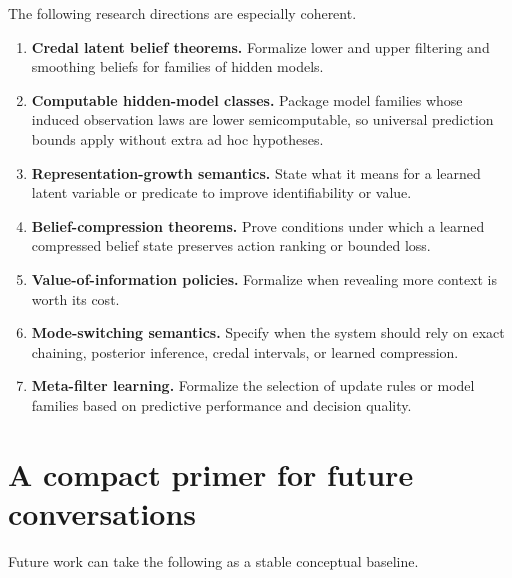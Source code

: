 \documentclass[11pt]{article}
\begin{document}
The following research directions are especially coherent.

\begin{enumerate}
  \item \textbf{Credal latent belief theorems.}  Formalize lower and upper
        filtering and smoothing beliefs for families of hidden models.
  \item \textbf{Computable hidden-model classes.}  Package model families whose
        induced observation laws are lower semicomputable, so universal
        prediction bounds apply without extra ad hoc hypotheses.
  \item \textbf{Representation-growth semantics.}  State what it means for a
        learned latent variable or predicate to improve identifiability or value.
  \item \textbf{Belief-compression theorems.}  Prove conditions under which a
        learned compressed belief state preserves action ranking or bounded loss.
  \item \textbf{Value-of-information policies.}  Formalize when revealing more
        context is worth its cost.
  \item \textbf{Mode-switching semantics.}  Specify when the system should rely
        on exact chaining, posterior inference, credal intervals, or learned
        compression.
  \item \textbf{Meta-filter learning.}  Formalize the selection of update rules
        or model families based on predictive performance and decision quality.
\end{enumerate}

\section{A compact primer for future conversations}

Future work can take the following as a stable conceptual baseline.
\end{document}
